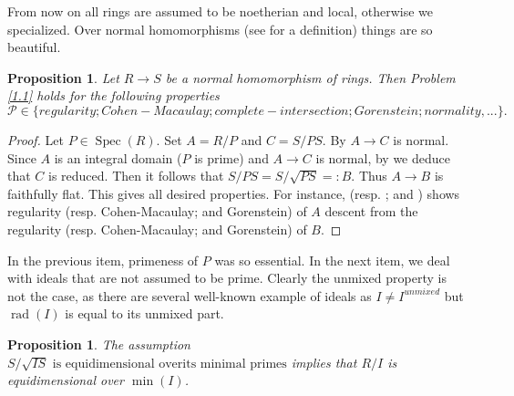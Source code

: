 \documentclass[10pt,a4paper]{amsart}
\newtheorem{proposition}[theorem]{Proposition}
\theoremstyle{definition}
\theoremstyle{remark}
\newcommand{\rad}{\operatorname{rad}}
\begin{document}
 





From now on all rings are assumed  to be noetherian and local, otherwise we specialized.
Over normal homomorphisms (see \cite[Definition 19.0.1]{HS} for a definition) things are so beautiful.
\begin{proposition}\label{n}
	Let \(R\to S\) be a normal homomorphism of rings. Then Problem \ref{1.1} holds for the following properties$$\mathcal P
	\in\{regularity; Cohen-Macaulay; complete-intersection; Gorenstein; normality,...\}.$$
\end{proposition}


\begin{proof} Let
	\(P\in\operatorname{Spec}(R)\). Set
	$A=R/P$ and $C=S/PS.$ By \cite[Proposition 19.1.2]{HS} $A\to C$ is normal. Since $A$ is an integral domain ($P$ is prime) and
	$A\to C$ is normal, by \cite[Proposition 19.1.3~(1)]{HS} we deduce that $C$ is reduced. Then it follows that
$
	S/PS=S/\sqrt{PS}=:B.
 $
	Thus \(A\to B\) is  faithfully flat.
	This gives all desired properties. For instance, \cite[Theorem 2.2.12]{BH} (resp. \cite[Theorem  2.1.7]{BH}; and  \cite[Corollary 3.3.15]{BH}) shows regularity (resp. Cohen-Macaulay; and Gorenstein) of $A$ descent from the regularity (resp. Cohen-Macaulay; and Gorenstein) of $B$.
\end{proof}

In the previous item, primeness of $P$ was so essential.
In the next item,  we deal with ideals that  are not assumed to be prime.
Clearly the unmixed property is not the case, as there are several well-known example of ideals as $I\neq I^{unmixed}$ but $\rad(I)$ is equal to its unmixed part. 
\begin{proposition}
	The assumption  $S/\sqrt{IS}\text{ is equidimensional overits  minimal primes}
	$ implies that
	$R/I$ is equidimensional over $\min(I)$.
\end{proposition}
\end{document}
